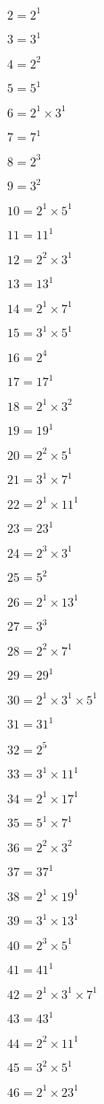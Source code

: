 $2 = 2^{1}$

$3 = 3^{1}$

$4 = 2^{2}$

$5 = 5^{1}$

$6 = 2^{1} × 3^{1}$

$7 = 7^{1}$

$8 = 2^{3}$

$9 = 3^{2}$

$10 = 2^{1} × 5^{1}$

$11 = 11^{1}$

$12 = 2^{2} × 3^{1}$

$13 = 13^{1}$

$14 = 2^{1} × 7^{1}$

$15 = 3^{1} × 5^{1}$

$16 = 2^{4}$

$17 = 17^{1}$

$18 = 2^{1} × 3^{2}$

$19 = 19^{1}$

$20 = 2^{2} × 5^{1}$

$21 = 3^{1} × 7^{1}$

$22 = 2^{1} × 11^{1}$

$23 = 23^{1}$

$24 = 2^{3} × 3^{1}$

$25 = 5^{2}$

$26 = 2^{1} × 13^{1}$

$27 = 3^{3}$

$28 = 2^{2} × 7^{1}$

$29 = 29^{1}$

$30 = 2^{1} × 3^{1} × 5^{1}$

$31 = 31^{1}$

$32 = 2^{5}$

$33 = 3^{1} × 11^{1}$

$34 = 2^{1} × 17^{1}$

$35 = 5^{1} × 7^{1}$

$36 = 2^{2} × 3^{2}$

$37 = 37^{1}$

$38 = 2^{1} × 19^{1}$

$39 = 3^{1} × 13^{1}$

$40 = 2^{3} × 5^{1}$

$41 = 41^{1}$

$42 = 2^{1} × 3^{1} × 7^{1}$

$43 = 43^{1}$

$44 = 2^{2} × 11^{1}$

$45 = 3^{2} × 5^{1}$

$46 = 2^{1} × 23^{1}$

